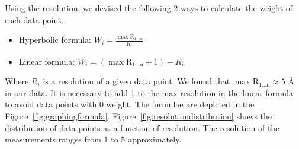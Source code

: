 \documentclass[11pt]{article}
\begin{document}
Using the resolution, we devised the following 2 ways to calculate the weight of each data point.
\begin{itemize}
\item Hyperbolic formula: $  W_i = \frac{ \mathrm{\max{R_{1 ...  n}}}}{R_i}  $
\item Linear formula: $ W_i = (\mathrm{\max{R_{1 ...  n}}} + 1) - R_i $
\end{itemize}

Where $R_i$ is a resolution of a given data point.
We found that $\mathrm{\max{R_{1 ...  n}}} \approx 5$ \si{\angstrom} in our data.
It is necessary to add 1 to the max resolution in the linear formula to avoid data points with 0 weight.
The formulae are depicted in the Figure~\ref{fig:graphingformula}.
Figure~\ref{fig:resolutiondistribution} shows the distribution of data points as a function of resolution.
The resolution of the measurements ranges from 1 to 5 approximately.
\end{document}
